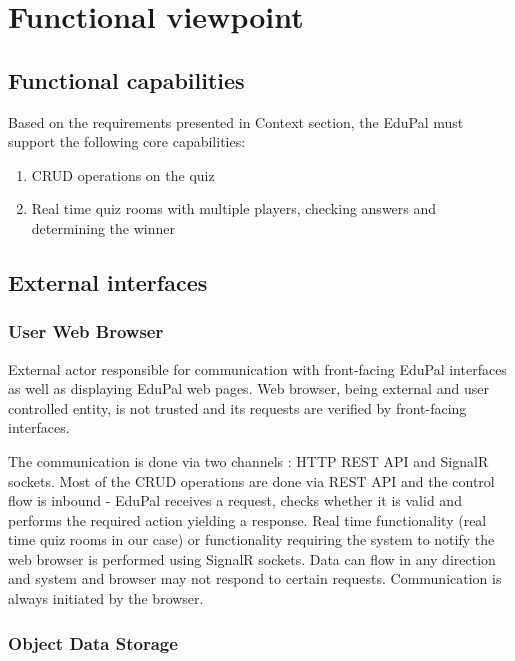 \section{Functional viewpoint}

\subsection{Functional capabilities}

Based on the requirements presented in Context section, the EduPal must support the following core capabilities:

\begin{enumerate}
  \item CRUD operations on the quiz
  \item Real time quiz rooms with multiple players, checking answers and determining the winner
\end{enumerate}

\subsection{External interfaces}

\subsubsection{User Web Browser}

External actor responsible for communication with front-facing EduPal interfaces as well as displaying EduPal web pages. Web browser, being external and user controlled entity, is not trusted and its requests are verified by front-facing interfaces.

The communication is done via two channels : HTTP REST API and SignalR sockets. Most of the CRUD operations are done via REST API and the control flow is inbound - EduPal receives a request, checks whether it is valid and performs the required action yielding a response. Real time functionality (real time quiz rooms in our case) or functionality requiring the system to notify the web browser is performed using SignalR sockets. Data can flow in any direction and system and browser may not respond to certain requests. Communication is always initiated by the browser.

\subsubsection{Object Data Storage}

